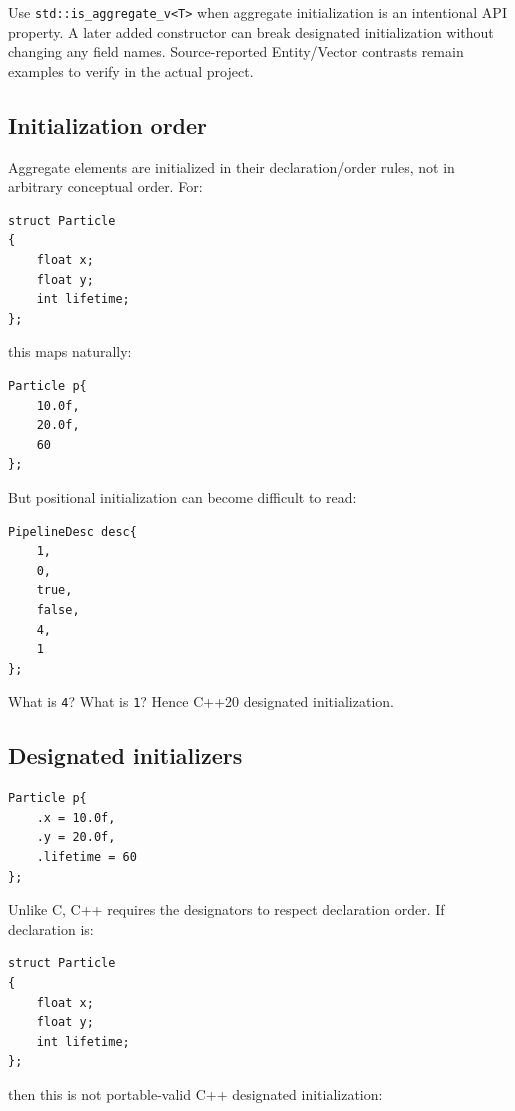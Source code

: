 Use \texttt{std::is\_aggregate\_v\textless{}T\textgreater{}} when aggregate initialization is an intentional API property. A later added constructor can break designated initialization without changing any field names. Source-reported Entity/Vector contrasts remain examples to verify in the actual project.

\subsection{Initialization order}\label{05-engine-i-ch003-initialization-order}

Aggregate elements are initialized in their declaration/order rules, not in arbitrary conceptual order. For:

\begin{verbatim}
struct Particle
{
    float x;
    float y;
    int lifetime;
};
\end{verbatim}

this maps naturally:

\begin{verbatim}
Particle p{
    10.0f,
    20.0f,
    60
};
\end{verbatim}

But positional initialization can become difficult to read:

\begin{verbatim}
PipelineDesc desc{
    1,
    0,
    true,
    false,
    4,
    1
};
\end{verbatim}

What is \texttt{4}? What is \texttt{1}? Hence C++20 designated initialization.

\subsection{Designated initializers}\label{05-engine-i-ch003-designated-initializers}

\begin{verbatim}
Particle p{
    .x = 10.0f,
    .y = 20.0f,
    .lifetime = 60
};
\end{verbatim}

Unlike C, C++ requires the designators to respect declaration order. If declaration is:

\begin{verbatim}
struct Particle
{
    float x;
    float y;
    int lifetime;
};
\end{verbatim}

then this is not portable-valid C++ designated initialization:

